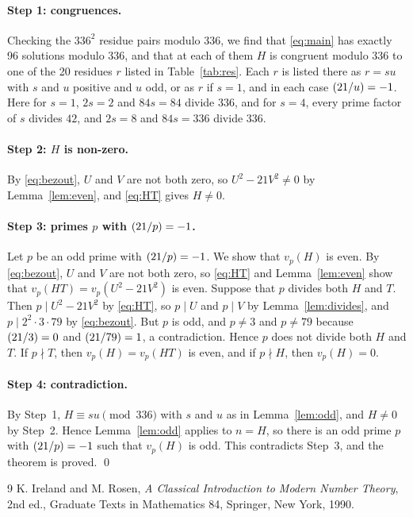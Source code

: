 \documentclass[11pt]{article}
\newcommand{\leg}[2]{\mathchoice{\biggl(\dfrac{#1}{#2}\biggr)}{(#1/#2)}{(#1/#2)}{(#1/#2)}}
\begin{document}
\paragraph{Step 1: congruences.} Checking the $336^2$ residue pairs modulo $336$, we find that \eqref{eq:main} has exactly 96 solutions modulo $336$, and that at each of them $H$ is congruent modulo $336$ to one of the 20 residues $r$ listed in Table~\ref{tab:res}. Each $r$ is listed there as $r=su$ with $s$ and $u$ positive and $u$ odd, or as $r$ if $s=1$, and in each case $\leg{21}{u}=-1$. Here for $s=1$, $2s=2$ and $84s=84$ divide $336$, and for $s=4$, every prime factor of $s$ divides $42$, and $2s=8$ and $84s=336$ divide $336$.

\paragraph{Step 2: $H$ is non-zero.} By \eqref{eq:bezout}, $U$ and $V$ are not both zero, so $U^2-21V^2\neq0$ by Lemma~\ref{lem:even}, and \eqref{eq:HT} gives $H\neq0$.

\paragraph{\texorpdfstring{Step 3: primes $p$ with $\leg{21}{p}=-1$.}{Step 3: inert primes.}} Let $p$ be an odd prime with $\leg{21}{p}=-1$. We show that $v_p(H)$ is even. By \eqref{eq:bezout}, $U$ and $V$ are not both zero, so \eqref{eq:HT} and Lemma~\ref{lem:even} show that $v_p(HT)=v_p(U^2-21V^2)$ is even. Suppose that $p$ divides both $H$ and $T$. Then $p\mid U^2-21V^2$ by \eqref{eq:HT}, so $p\mid U$ and $p\mid V$ by Lemma~\ref{lem:divides}, and $p\mid 2^{2}\cdot 3\cdot 79$ by \eqref{eq:bezout}. But $p$ is odd, and $p\neq3$ and $p\neq79$ because $\leg{21}{3}=0$ and $\leg{21}{79}=1$, a contradiction. Hence $p$ does not divide both $H$ and $T$. If $p\nmid T$, then $v_p(H)=v_p(HT)$ is even, and if $p\nmid H$, then $v_p(H)=0$.

\paragraph{Step 4: contradiction.} By Step~1, $H\equiv su\pmod{336}$ with $s$ and $u$ as in Lemma~\ref{lem:odd}, and $H\neq0$ by Step~2. Hence Lemma~\ref{lem:odd} applies to $n=H$, so there is an odd prime $p$ with $\leg{21}{p}=-1$ such that $v_p(H)$ is odd. This contradicts Step~3, and the theorem is proved.
\qed

\begin{thebibliography}{9}
 K. Ireland and M. Rosen, \emph{A Classical Introduction to Modern Number Theory}, 2nd ed., Graduate Texts in Mathematics 84, Springer, New York, 1990.
\end{thebibliography}
\end{document}
